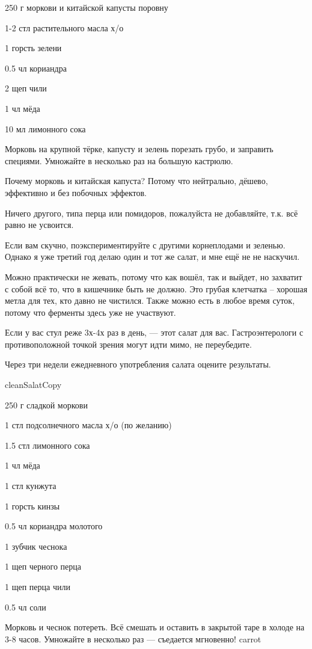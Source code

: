 {\label{cleanSalad}
\item 250 г моркови и китайской капусты поровну
\item 1-2 стл растительного масла х/о 
\item 1 горсть зелени
}{
\item 0.5 чл кориандра
\item 2 щеп чили
\item 1 чл мёда
\item 10 мл лимонного сока
}{
Морковь на крупной тёрке, капусту и зелень порезать грубо, и заправить специями. Умножайте в несколько раз на большую кастрюлю.
}{
\begin{advice}
\item Почему морковь и китайская капуста? Потому что нейтрально, дёшево, эффективно и без побочных эффектов. 
\item Ничего другого, типа перца или помидоров, пожалуйста не добавляйте, т.к. всё равно не усвоится. 
\item Если вам скучно, поэкспериментируйте с другими корнеплодами и зеленью. Однако я уже третий год делаю один и тот же салат, и мне ещё не не наскучил.

\item Можно практически не жевать, потому что как вошёл, так и выйдет, но захватит с собой всё то, что в кишечнике быть не должно. Это грубая клетчатка – хорошая метла для тех, кто давно не чистился. Также можно есть в любое время суток, потому что ферменты здесь уже не участвуют.
\item Если у вас стул реже 3х-4х раз в день, — этот салат для вас. 
Гастроэнтерологи с противоположной точкой зрения могут идти мимо, не переубедите.

\item Через три недели ежедневного употребления салата оцените результаты. 

\end{advice}
}{cleanSalatCopy}  %




{
\item 250 г сладкой моркови
\item 1 стл подсолнечного масла х/о (по желанию)
\item 1.5 стл лимонного сока 
\item 1 чл мёда
\item 1 стл кунжута
\item 1 горсть кинзы
}{
\item 0.5 чл кориандра молотого
\item 1 зубчик чеснока
\item 1 щеп черного перца
\item 1 щеп перца чили
\item 0.5 чл соли
}{
Морковь и чеснок потереть. Всё смешать и оставить в закрытой таре в холоде на 3-8 часов. Умножайте в несколько раз — съедается мгновенно!
}{}{carrot}  %



